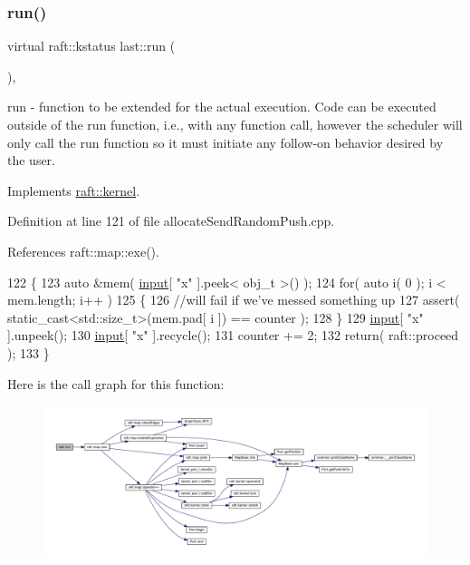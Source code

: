 \subsubsection{\texorpdfstring{run()}{run()}\hspace{0.1cm}{\footnotesize\ttfamily [6/6]}}
{\footnotesize\ttfamily virtual raft\+::kstatus last\+::run (\begin{DoxyParamCaption}{ }\end{DoxyParamCaption})\hspace{0.3cm}{\ttfamily [inline]}, {\ttfamily [virtual]}}

run -\/ function to be extended for the actual execution. Code can be executed outside of the run function, i.\+e., with any function call, however the scheduler will only call the run function so it must initiate any follow-\/on behavior desired by the user. 

Implements \hyperlink{classraft_1_1kernel_a05094286d7577360fb1b91c91fc05901}{raft\+::kernel}.



Definition at line 121 of file allocate\+Send\+Random\+Push.\+cpp.



References raft\+::map\+::exe().


\begin{DoxyCode}
122     \{
123         \textcolor{keyword}{auto} &mem( \hyperlink{classraft_1_1kernel_a6edbe35a56409d402e719b3ac36d6554}{input}[ \textcolor{stringliteral}{"x"} ].peek< obj\_t >() );
124         \textcolor{keywordflow}{for}( \textcolor{keyword}{auto} i( 0 ); i < mem.length; i++ )
125         \{
126             \textcolor{comment}{//will fail if we've messed something up}
127             assert( static\_cast<std::size\_t>(mem.pad[ i ]) == counter );
128         \}
129         \hyperlink{classraft_1_1kernel_a6edbe35a56409d402e719b3ac36d6554}{input}[ \textcolor{stringliteral}{"x"} ].unpeek();
130         \hyperlink{classraft_1_1kernel_a6edbe35a56409d402e719b3ac36d6554}{input}[ \textcolor{stringliteral}{"x"} ].recycle();
131         counter += 2;
132         \textcolor{keywordflow}{return}( raft::proceed );
133     \}
\end{DoxyCode}
Here is the call graph for this function\+:
\nopagebreak
\begin{figure}[H]
\begin{center}
\leavevmode
\includegraphics[width=350pt]{classlast_a7a1da1c30f571a8e8ccb515ca2cb2f02_cgraph}
\end{center}
\end{figure}


